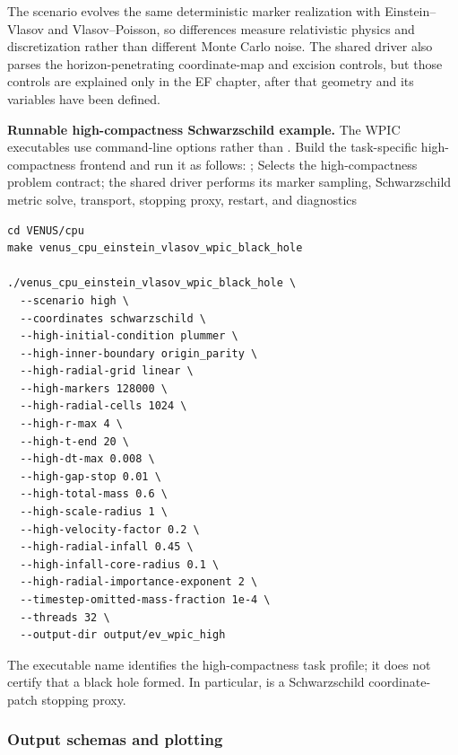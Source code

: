 The  scenario evolves the same deterministic marker realization
with Einstein--Vlasov and Vlasov--Poisson, so differences measure relativistic
physics and discretization rather than different Monte Carlo noise.  The
shared driver also parses the horizon-penetrating coordinate-map and excision
controls, but those controls are explained only in the EF chapter, after that
geometry and its variables have been defined.

\noindent\textbf{Runnable high-compactness Schwarzschild example.}
The WPIC executables use command-line options rather than .
Build the task-specific high-compactness frontend and run it as follows:
{;
 }
{Selects the high-compactness problem contract; the shared driver performs its
 marker sampling, Schwarzschild metric solve, transport, stopping proxy,
 restart, and diagnostics}
\begin{lstlisting}[basicstyle=\ttfamily\scriptsize]
cd VENUS/cpu
make venus_cpu_einstein_vlasov_wpic_black_hole

./venus_cpu_einstein_vlasov_wpic_black_hole \
  --scenario high \
  --coordinates schwarzschild \
  --high-initial-condition plummer \
  --high-inner-boundary origin_parity \
  --high-radial-grid linear \
  --high-markers 128000 \
  --high-radial-cells 1024 \
  --high-r-max 4 \
  --high-t-end 20 \
  --high-dt-max 0.008 \
  --high-gap-stop 0.01 \
  --high-total-mass 0.6 \
  --high-scale-radius 1 \
  --high-velocity-factor 0.2 \
  --high-radial-infall 0.45 \
  --high-infall-core-radius 0.1 \
  --high-radial-importance-exponent 2 \
  --timestep-omitted-mass-fraction 1e-4 \
  --threads 32 \
  --output-dir output/ev_wpic_high
\end{lstlisting}
The executable name identifies the high-compactness task profile; it does not
certify that a black hole formed.  In particular,  is a
Schwarzschild coordinate-patch stopping proxy.

\subsubsection{Output schemas and plotting}

